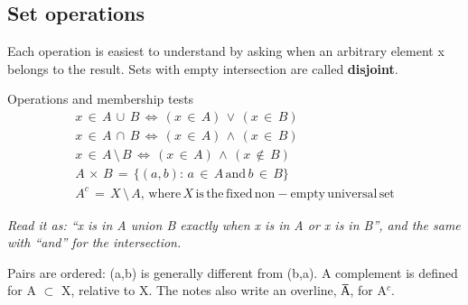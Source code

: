 \documentclass[11pt]{article}
\begin{document}
\begin{keepsection}
\begin{keepsection}
\subsection{Set operations}

Each operation is easiest to understand by asking when an arbitrary element x belongs to the result. Sets with empty intersection are called \textbf{disjoint}.

\begin{equationcard}{Operations and membership tests}
\[ \begin{gathered} {x}\, \in \, {A}\, \cup \, {B}\, \Leftrightarrow \, ({x}\, \in \, {A})\, \lor \, ({x}\, \in \, {B}) \\ {x}\, \in \, {A}\, \cap \, {B}\, \Leftrightarrow \, ({x}\, \in \, {A})\, \land \, ({x}\, \in \, {B}) \\ {x}\, \in \, {A}\, \setminus \, {B}\, \Leftrightarrow \, ({x}\, \in \, {A})\, \land \, ({x}\, \notin \, {B}) \\ {A}\, \times \, {B}\, =\, \{({a},{b}):\, {a}\, \in \, {A}\, \text{and}\, {b}\, \in \, {B}\} \\ {A}^{c}\, =\, {X}\, \setminus \, {A},\, \text{where}\, {X}\, \text{is}\, \text{the}\, \text{fixed}\, \text{non}-\text{empty}\, \text{universal}\, \text{set} \end{gathered} \]
{\small \emph{Read it as: “x is in A union B exactly when x is in A or x is in B”, and the same with “and” for the intersection.}\par Pairs are ordered: (a,b) is generally different from (b,a). A complement is defined for A \ensuremath{\subset} X, relative to X. The notes also write an overline, A̅, for A\ensuremath{^{c}}.}
\end{equationcard}


\end{keepsection}
\end{keepsection}
\end{document}
